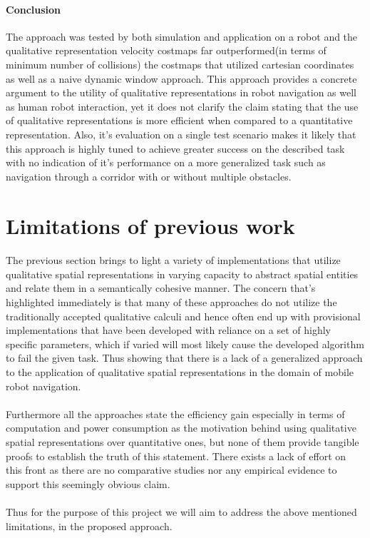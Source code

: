 \begin{itemize}
	
	\paragraph{Conclusion}The approach was tested by both simulation and application on a robot and the qualitative representation velocity costmaps far outperformed(in terms of minimum number of collisions) the costmaps that utilized cartesian coordinates as well as a naive dynamic window approach. This approach provides a concrete argument to the utility of qualitative representations in robot navigation as well as human robot interaction, yet it does not clarify the claim stating that the use of qualitative representations is more efficient when compared to a quantitative representation. Also, it's evaluation on a single test scenario makes it likely that this approach is highly tuned to achieve greater success on the described task with no indication of it's performance on a more generalized task such as navigation through a corridor with or without multiple obstacles.

\end{itemize}

\section{Limitations of previous work}
\paragraph{} The previous section brings to light a variety of implementations that utilize qualitative spatial representations in varying capacity to abstract spatial entities and relate them in a semantically cohesive manner. The concern that's highlighted immediately is that many of these approaches do not utilize the traditionally accepted qualitative calculi and hence often end up with provisional implementations that have been developed with reliance on a set of highly specific parameters, which if varied will most likely cause the developed algorithm to fail the given task. Thus showing that there is a lack of a generalized approach to the application of qualitative spatial representations in the domain of mobile robot navigation.

\paragraph{} Furthermore all the approaches state the efficiency gain especially in terms of computation and power consumption as the motivation behind using qualitative spatial representations over quantitative ones, but none of them provide tangible proofs to establish the truth of this statement. There exists a lack of effort on this front as there are no comparative studies nor any empirical evidence to support this seemingly obvious claim. 

\paragraph{} Thus for the purpose of this project we will aim to address the above mentioned limitations, in the proposed approach.
